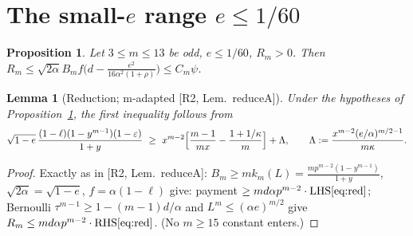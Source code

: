 \documentclass[11pt]{amsart}
\newcommand{\eps}{\varepsilon}
\newtheorem{lemma}[theorem]{Lemma}
\newtheorem{proposition}[theorem]{Proposition}
\begin{document}
\section{The small-$e$ range $e\le1/60$}

\begin{proposition}\label{prop:smalle}
Let $3\le m\le13$ be odd, $e\le1/60$, $R_m>0$.  Then
$R_m\le\sqrt{2\alpha}B_mf\bigl(d-\frac{e^2}{16\alpha^2(1+\rho)}\bigr)\le C_m\psi$.
\end{proposition}

\begin{lemma}[Reduction; m-adapted {[R2, Lem.~reduceA]}]\label{lem:reduce}
Under the hypotheses of Proposition~\ref{prop:smalle}, the first inequality
follows from
\begin{equation}\label{eq:red}
 \sqrt{1-e}\,\frac{(1-\ell)(1-y^{m-1})(1-\eps)}{1+y}
 \ \ge\
 x^{m-2}\Bigl[\frac{m-1}{mx}-\frac{1+1/\kappa}{m}\Bigr]+\Lambda,
 \qquad
 \Lambda:=\frac{x^{m-2}(e/\alpha)^{m/2-1}}{m\kappa}.
\end{equation}
\end{lemma}

\begin{proof}
Exactly as in [R2, Lem.~reduceA]: $B_m\ge mk_m(L)=\frac{mp^{m-2}(1-y^{m-1})}{1+y}$,
$\sqrt{2\alpha}=\sqrt{1-e}$, $f=\alpha(1-\ell)$ give: payment
$\ge md\alpha p^{m-2}\cdot\mathrm{LHS}\eqref{eq:red}$; Bernoulli
$\tau^{m-1}\ge1-(m-1)d/\alpha$ and $L^m\le(\alpha e)^{m/2}$ give
$R_m\le md\alpha p^{m-2}\cdot\mathrm{RHS}\eqref{eq:red}$.
(No $m\ge15$ constant enters.)
\end{proof}
\end{document}
